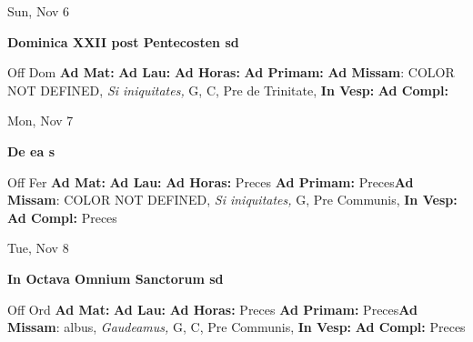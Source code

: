 \documentclass[10pt]{book}
\begin{document}
\begin{center}
\begin{minipage}{3.5in}
\vspace{2em}
\begin{center}Sun, Nov 6
\end{center}
\textbf{ \large Dominica XXII post Pentecosten
\textnormal{\normalsize sd}}

\begin{justify}Off Dom
\textbf{Ad Mat: }
\textbf{Ad Lau: }
\textbf{Ad Horas: }
\textbf{Ad Primam: }\textbf{Ad Missam}: COLOR NOT DEFINED, \textit{Si iniquitates,} G, C, Pre de Trinitate, 
\textbf{In Vesp: }
\textbf{Ad Compl: }
\end{justify}
\end{minipage}
\end{center}

\begin{center}
\begin{minipage}{3.5in}
\vspace{2em}
\begin{center}Mon, Nov 7
\end{center}
\textbf{ \large De ea
\textnormal{\normalsize s}}

\begin{justify}Off Fer
\textbf{Ad Mat: }
\textbf{Ad Lau: }
\textbf{Ad Horas: }Preces
\textbf{Ad Primam: }Preces\textbf{Ad Missam}: COLOR NOT DEFINED, \textit{Si iniquitates,} G, Pre Communis, 
\textbf{In Vesp: }
\textbf{Ad Compl: }Preces
\end{justify}
\end{minipage}
\end{center}

\begin{center}
\begin{minipage}{3.5in}
\vspace{2em}
\begin{center}Tue, Nov 8
\end{center}
\textbf{ \large In Octava Omnium Sanctorum
\textnormal{\normalsize sd}}

\begin{justify}Off Ord
\textbf{Ad Mat: }
\textbf{Ad Lau: }
\textbf{Ad Horas: }Preces
\textbf{Ad Primam: }Preces\textbf{Ad Missam}: albus, \textit{Gaudeamus,} G, C, Pre Communis, 
\textbf{In Vesp: }
\textbf{Ad Compl: }Preces
\end{justify}
\end{minipage}
\end{center}
\end{document}
